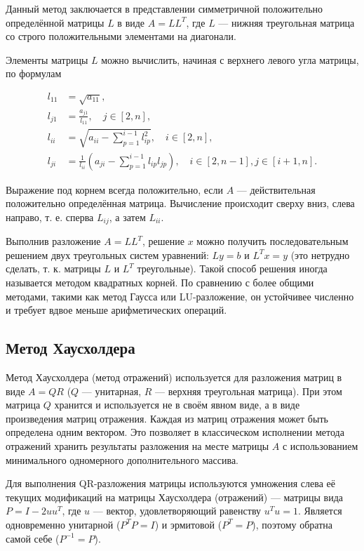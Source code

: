 \documentclass[a4paper,12pt,titlepage,finall]{article}
\begin{document}
Данный метод заключается в представлении симметричной положительно определённой матрицы $\displaystyle L$ в виде $\displaystyle A=LL^{T}$, где $\displaystyle L$ — нижняя треугольная матрица со строго положительными элементами на диагонали.

Элементы матрицы $\displaystyle L$ можно вычислить, начиная с верхнего левого угла матрицы, по формулам

\[\displaystyle {\begin{aligned}l_{11}&={\sqrt {a_{11}}},\\l_{j1}&={\frac {a_{j1}}{l_{11}}},\quad j\in [2,n],\\l_{ii}&={\sqrt {a_{ii}-\sum _{p=1}^{i-1}l_{ip}^{2}}},\quad i\in [2,n],\\l_{ji}&={\frac {1}{l_{ii}}}\left(a_{ji}-\sum _{p=1}^{i-1}l_{ip}l_{jp}\right),\quad i\in [2,n-1],j\in [i+1,n].\end{aligned}}\]

Выражение под корнем всегда положительно, если $\displaystyle A$ — действительная положительно определённая матрица. Вычисление происходит сверху вниз, слева направо, т. е. сперва $\displaystyle L_{ij}$, а затем $\displaystyle L_{ii}$.

Выполнив разложение $\displaystyle A=LL^{T}$, решение $\displaystyle x$ можно получить последовательным решением двух треугольных систем уравнений: $\displaystyle Ly=b$ и $\displaystyle L^{T}x=y$ (это нетрудно сделать, т. к. матрицы $L$ и $L^T$ треугольные). Такой способ решения иногда называется методом квадратных корней. По сравнению с более общими методами, такими как метод Гаусса или LU-разложение, он устойчивее численно и требует вдвое меньше арифметических операций.

\subsection{Метод Хаусхолдера}

Метод Хаусхолдера (метод отражений) используется для разложения матриц в виде $A=QR$ ($Q$ — унитарная, $R$ — верхняя треугольная матрица). При этом матрица $Q$ хранится и используется не в своём явном виде, а в виде произведения матриц отражения. Каждая из матриц отражения может быть определена одним вектором. Это позволяет в классическом исполнении метода отражений хранить результаты разложения на месте матрицы $A$ с использованием минимального одномерного дополнительного массива.

Для выполнения QR-разложения матрицы используются умножения слева её текущих модификаций на матрицы Хаусхолдера (отражений) — матрицы вида $P=I-2uu^T$, где $u$ — вектор, удовлетворяющий равенству $u^{T}u=1$. Является одновременно унитарной ($P^{T}P=I$) и эрмитовой ($P^{T}=P$), поэтому обратна самой себе ($P^{-1}=P$).
\end{document}
